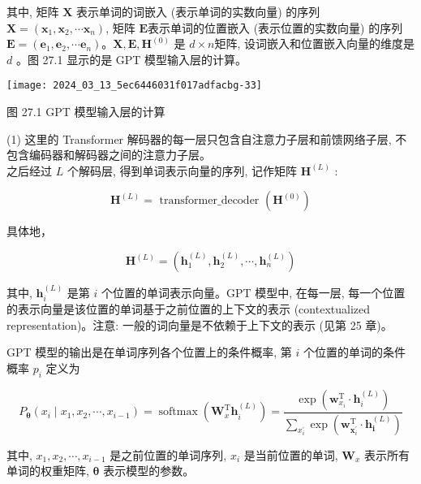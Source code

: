 \documentclass[10pt]{article}
\begin{document}
其中, 矩阵 $\boldsymbol{X}$ 表示单词的词嵌入 (表示单词的实数向量) 的序列 $\boldsymbol{X}=\left(\boldsymbol{x}_{1}, \boldsymbol{x}_{2}, \cdots \boldsymbol{x}_{n}\right)$, 矩阵 $\boldsymbol{E}$表示单词的位置嵌入 (表示位置的实数向量) 的序列 $\boldsymbol{E}=\left(\boldsymbol{e}_{1}, \boldsymbol{e}_{2}, \cdots \boldsymbol{e}_{n}\right) 。 \boldsymbol{X}, \boldsymbol{E}, \boldsymbol{H}^{(0)}$ 是 $d \times n$矩阵, 设词嵌入和位置嵌入向量的维度是 $d$ 。图 27.1 显示的是 GPT 模型输入层的计算。

\begin{center}
\texttt{[image: 2024\_03\_13\_5ec6446031f017adfacbg-33]}
\end{center}

图 27.1 GPT 模型输入层的计算

(1) 这里的 Transformer 解码器的每一层只包含自注意力子层和前馈网络子层, 不包含编码器和解码器之间的注意力子层。\\
之后经过 $L$ 个解码层, 得到单词表示向量的序列, 记作矩阵 $\boldsymbol{H}^{(L)}$ :


\begin{equation*}
\boldsymbol{H}^{(L)}=\text { transformer_decoder }\left(\boldsymbol{H}^{(0)}\right) \tag{27.6}
\end{equation*}


具体地，

$$
\boldsymbol{H}^{(L)}=\left(\boldsymbol{h}_{1}^{(L)}, \boldsymbol{h}_{2}^{(L)}, \cdots, \boldsymbol{h}_{n}^{(L)}\right)
$$

其中, $\boldsymbol{h}_{i}^{(L)}$ 是第 $i$ 个位置的单词表示向量。GPT 模型中, 在每一层, 每一个位置的表示向量是该位置的单词基于之前位置的上下文的表示 (contextualized representation)。注意: 一般的词向量是不依赖于上下文的表示 (见第 25 章)。

GPT 模型的输出是在单词序列各个位置上的条件概率, 第 $i$ 个位置的单词的条件概率 $p_{i}$ 定义为


\begin{equation*}
P_{\boldsymbol{\theta}}\left(x_{i} \mid x_{1}, x_{2}, \cdots, x_{i-1}\right)=\operatorname{softmax}\left(\boldsymbol{W}_{x}^{\mathrm{T}} \boldsymbol{h}_{i}^{(L)}\right)=\frac{\exp \left(\boldsymbol{w}_{x_{i}}^{\mathrm{T}} \cdot \boldsymbol{h}_{i}^{(L)}\right)}{\sum_{x_{i}^{\prime}} \exp \left(\boldsymbol{w}_{\boldsymbol{x}_{i}^{\prime}}^{\mathrm{T}} \cdot \boldsymbol{h}_{\boldsymbol{i}}^{(L)}\right)} \tag{27.7}
\end{equation*}


其中, $x_{1}, x_{2}, \cdots, x_{i-1}$ 是之前位置的单词序列, $x_{i}$ 是当前位置的单词, $\boldsymbol{W}_{x}$ 表示所有单词的权重矩阵, $\boldsymbol{\theta}$ 表示模型的参数。
\end{document}
